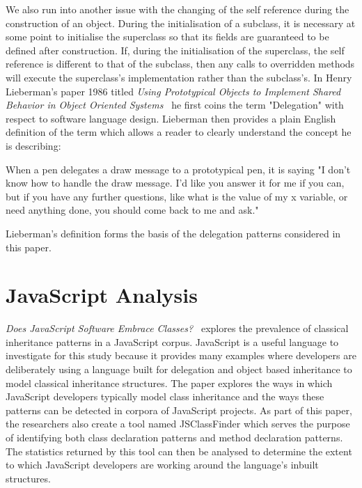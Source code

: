 We also run into another issue with the changing of the self reference during the construction of an object. During the initialisation of a subclass, it is necessary at some point to initialise the superclass so that its fields are guaranteed to be defined after construction. If, during the initialisation of the superclass, the self reference is different to that of the subclass, then any calls to overridden methods will execute the superclass's implementation rather than the subclass's.
\newline
\newline
In Henry Lieberman's paper 1986 titled \textit{Using Prototypical Objects to Implement Shared Behavior in Object Oriented Systems~\cite{UsingPrototypicalObjects}} he first coins the term "Delegation" with respect to software language design. Lieberman then provides a plain English definition of the term which allows a reader to clearly understand the concept he is describing:
\begin{displayquote}
	When a pen delegates a draw message to a prototypical pen, it is saying "I don't know how to handle the draw message. I'd like you answer it for me if you can, but if you have any further questions, like what is the value of my x variable, or need anything done, you should come back to me and ask."~\cite{UsingPrototypicalObjects}
\end{displayquote}
Lieberman's definition forms the basis of the delegation patterns considered in this paper.

\section{JavaScript Analysis}
\textit{Does JavaScript Software Embrace Classes?~\cite{JSClassFinder}} explores the prevalence of classical inheritance patterns in a JavaScript corpus. JavaScript is a useful language to investigate for this study because it provides many examples where developers are deliberately using a language built for delegation and object based inheritance to model classical inheritance structures. The paper explores the ways in which JavaScript developers typically model class inheritance and the ways these patterns can be detected in corpora of JavaScript projects. As part of this paper, the researchers also create a tool named JSClassFinder which serves the purpose of identifying both class declaration patterns and method declaration patterns. The statistics returned by this tool can then be analysed to determine the extent to which JavaScript developers are working around the language's inbuilt structures.


